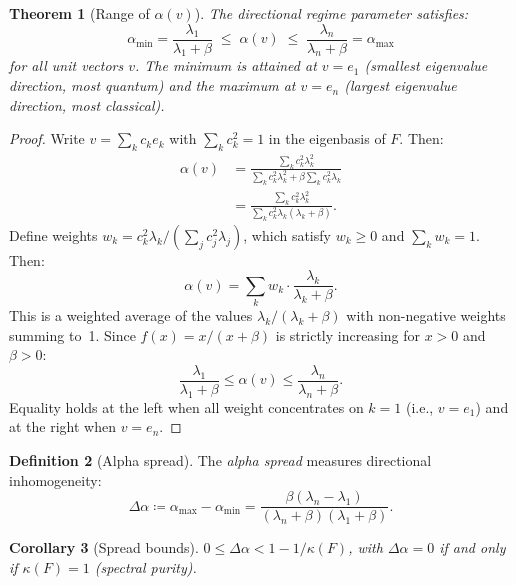 \documentclass[11pt,a4paper]{article}
\theoremstyle{plain}
\newtheorem{theorem}{Theorem}[section]
\newtheorem{corollary}[theorem]{Corollary}
\theoremstyle{definition}
\newtheorem{definition}[theorem]{Definition}
\begin{document}
\begin{theorem}[Range of $\alpha(v)$]
\label{thm:alpha_range}
The directional regime parameter satisfies:
\begin{equation}
\label{eq:alpha_bounds}
\alpha_{\min}
  = \frac{\lambda_1}{\lambda_1 + \beta}
  \;\leq\;
  \alpha(v)
  \;\leq\;
  \frac{\lambda_n}{\lambda_n + \beta}
  = \alpha_{\max}
\end{equation}
for all unit vectors $v$.  The minimum is attained at $v = e_1$
(smallest eigenvalue direction, most quantum) and the maximum at
$v = e_n$ (largest eigenvalue direction, most classical).
\end{theorem}

\begin{proof}
Write $v = \sum_k c_k e_k$ with $\sum_k c_k^2 = 1$ in the
eigenbasis of $F$.  Then:
\begin{align}
\alpha(v)
  &= \frac{\sum_k c_k^2 \lambda_k^2}
          {\sum_k c_k^2 \lambda_k^2 + \beta \sum_k c_k^2 \lambda_k}
  \label{eq:alpha_expansion} \\
  &= \frac{\sum_k c_k^2 \lambda_k^2}
          {\sum_k c_k^2 \lambda_k(\lambda_k + \beta)}.
  \nonumber
\end{align}
Define weights $w_k = c_k^2 \lambda_k / (\sum_j c_j^2 \lambda_j)$,
which satisfy $w_k \geq 0$ and $\sum_k w_k = 1$.  Then:
\[
\alpha(v) = \sum_k w_k \cdot \frac{\lambda_k}{\lambda_k + \beta}.
\]
This is a weighted average of the values
$\lambda_k/(\lambda_k + \beta)$ with non-negative weights summing
to~1.  Since $f(x) = x/(x+\beta)$ is strictly increasing for
$x > 0$ and $\beta > 0$:
\[
\frac{\lambda_1}{\lambda_1 + \beta}
\leq \alpha(v) \leq
\frac{\lambda_n}{\lambda_n + \beta}.
\]
Equality holds at the left when all weight concentrates on
$k = 1$ (i.e., $v = e_1$) and at the right when $v = e_n$.
\end{proof}

\begin{definition}[Alpha spread]
\label{def:alpha_spread}
The \emph{alpha spread} measures directional inhomogeneity:
\begin{equation}
\label{eq:spread}
\Delta\alpha
  \coloneqq \alpha_{\max} - \alpha_{\min}
  = \frac{\beta(\lambda_n - \lambda_1)}
         {(\lambda_n + \beta)(\lambda_1 + \beta)}.
\end{equation}
\end{definition}

\begin{corollary}[Spread bounds]
\label{cor:spread_bounds}
$0 \leq \Delta\alpha < 1 - 1/\kappa(F)$, with
$\Delta\alpha = 0$ if and only if $\kappa(F) = 1$
(spectral purity).
\end{corollary}
\end{document}
